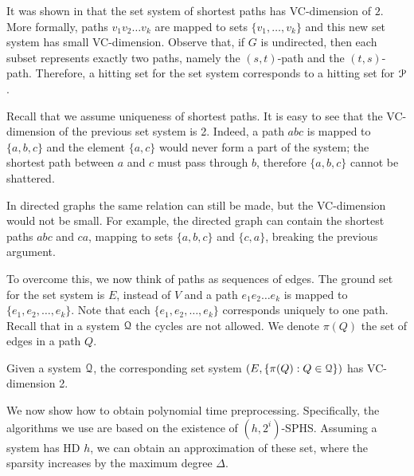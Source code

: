 It was shown in \cite{highway2013} that the set system of shortest paths has VC-dimension of $2$.
More formally, paths $v_1v_2\ldots v_k$ are mapped to sets $\{v_1,\ldots,v_k\}$ and this new set system has small VC-dimension.
Observe that, if $G$ is undirected, then each subset represents exactly two paths, namely the $(s,t)$-path and the $(t,s)$-path.
Therefore, a hitting set for the set system corresponds to a hitting set for $\mathcal{P}$.

Recall that we assume uniqueness of shortest paths.
It is easy to see that the VC-dimension of the previous set system is 2.
Indeed, a path $abc$ is mapped to $\{a,b,c\}$ and the element $\{a,c\}$ would never form a part of the system; the shortest path between $a$ and $c$ must pass through $b$, therefore $\{a,b,c\}$ cannot be shattered.

In directed graphs the same relation can still be made, but the VC-dimension would not be small.
For example, the directed graph can contain the shortest paths $abc$ and $ca$, mapping to sets $\{a,b,c\}$ and $\{c,a\}$, breaking the previous argument.

To overcome this, we now think of paths as sequences of edges.
The ground set for the set system is $E$, instead of $V$ and a path $e_1e_2\ldots e_k$ is mapped to $\{e_1,e_2,\ldots,e_k\}$.
Note that each $\{e_1,e_2,\ldots,e_k\}$ corresponds uniquely to one path.
Recall that in a system $\mathcal{Q}$ the cycles are not allowed.
We denote $\pi(Q)$ the set of edges in a path $Q$.

\begin{proposition}
Given a system $\mathcal{Q}$, the corresponding set system $(E,\{\pi(Q):Q\in\mathcal{Q}\})$ has VC-dimension 2.
\end{proposition}

We now show how to obtain polynomial time preprocessing.
Specifically, the algorithms we use are based on the existence of $(h,2^i)$-SPHS.
Assuming a system has HD $h$, we can obtain an approximation of these set, where the sparsity increases by the maximum degree $\Delta$. 

